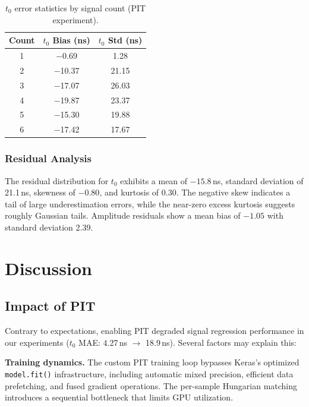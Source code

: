 \documentclass[11pt,twocolumn]{article}
\begin{document}
\begin{table}[t]
\centering
\caption{$t_0$ error statistics by signal count (PIT experiment).}
\label{tab:error_count}
\small
\begin{tabular}{ccc}
\toprule
\textbf{Count} & \textbf{$t_0$ Bias (ns)} & \textbf{$t_0$ Std (ns)} \\
\midrule
1 & $-$0.69 & 1.28 \\
2 & $-$10.37 & 21.15 \\
3 & $-$17.07 & 26.03 \\
4 & $-$19.87 & 23.37 \\
5 & $-$15.30 & 19.88 \\
6 & $-$17.42 & 17.67 \\
\bottomrule
\end{tabular}
\end{table}

\subsubsection{Residual Analysis}

The residual distribution for $t_0$ exhibits a mean of $-15.8$\,ns, standard deviation of 21.1\,ns, skewness of $-0.80$, and kurtosis of 0.30.
The negative skew indicates a tail of large underestimation errors, while the near-zero excess kurtosis suggests roughly Gaussian tails.
Amplitude residuals show a mean bias of $-1.05$ with standard deviation 2.39.

\section{Discussion}
\label{sec:discussion}

\subsection{Impact of PIT}

Contrary to expectations, enabling PIT degraded signal regression performance in our experiments ($t_0$ MAE: 4.27\,ns $\to$ 18.9\,ns).
Several factors may explain this:

\textbf{Training dynamics.}
The custom PIT training loop bypasses Keras's optimized \texttt{model.fit()} infrastructure, including automatic mixed precision, efficient data prefetching, and fused gradient operations.
The per-sample Hungarian matching introduces a sequential bottleneck that limits GPU utilization.
\end{document}
